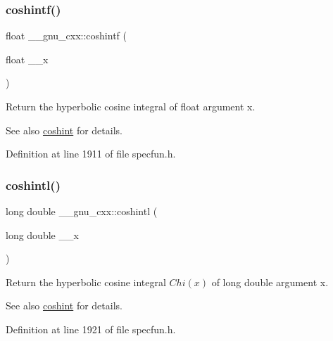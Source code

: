 \subsubsection{\texorpdfstring{coshintf()}{coshintf()}}
{\footnotesize\ttfamily float \+\_\+\+\_\+gnu\+\_\+cxx\+::coshintf (\begin{DoxyParamCaption}\item[{float}]{\+\_\+\+\_\+x }\end{DoxyParamCaption})\hspace{0.3cm}{\ttfamily [inline]}}

Return the hyperbolic cosine integral of {\ttfamily float} argument {\ttfamily x}.

\begin{DoxySeeAlso}{See also}
\hyperlink{group__mathsf__gnu_ga2411d513d418180285ace6650c7b7e31}{coshint} for details. 
\end{DoxySeeAlso}


Definition at line 1911 of file specfun.\+h.

\mbox{\label{group__mathsf__gnu_ga6d24ab53fad13d421f07d9a9a509de14}} 
\subsubsection{\texorpdfstring{coshintl()}{coshintl()}}
{\footnotesize\ttfamily long double \+\_\+\+\_\+gnu\+\_\+cxx\+::coshintl (\begin{DoxyParamCaption}\item[{long double}]{\+\_\+\+\_\+x }\end{DoxyParamCaption})\hspace{0.3cm}{\ttfamily [inline]}}

Return the hyperbolic cosine integral $ Chi(x) $ of {\ttfamily long double} argument {\ttfamily x}.

\begin{DoxySeeAlso}{See also}
\hyperlink{group__mathsf__gnu_ga2411d513d418180285ace6650c7b7e31}{coshint} for details. 
\end{DoxySeeAlso}


Definition at line 1921 of file specfun.\+h.

\mbox{\label{group__mathsf__gnu_gafd398869cde057087e6b3428a1d13a93}} 

